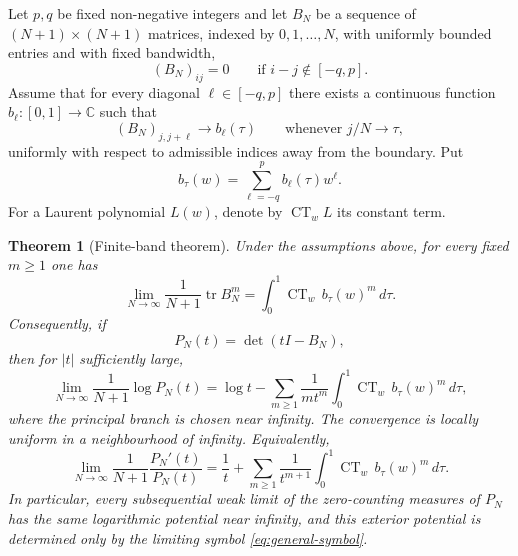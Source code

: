 \documentclass[10pt,twoside,a4paper,reqno]{amsart}
\theoremstyle{plain}
\newtheorem{theo}           {Theorem}
\theoremstyle{definition}
\theoremstyle{remark}
\newenvironment{theorem}{\begin{theo}}{\end{theo}}
\newcommand {\CT} {\operatorname {CT}}
\begin{document}
Let $p,q$ be fixed non-negative integers and let $B_N$ be a sequence of $(N+1)\times (N+1)$ matrices, indexed by $0,1,\ldots,N$, with uniformly bounded entries and with fixed bandwidth,
\[
        (B_N)_{ij}=0\qquad \text{if } i-j\notin[-q,p].
\]
Assume that for every diagonal $\ell\in[-q,p]$ there exists a continuous function $b_\ell:[0,1]\to\mathbb C$ such that
\[
        (B_N)_{j,j+\ell}\longrightarrow b_\ell(\tau)
        \qquad \text{whenever } j/N\to\tau,
\]
uniformly with respect to admissible indices away from the boundary.  Put
\begin{equation}\label{eq:general-symbol}
        b_\tau(w)=\sum_{\ell=-q}^{p} b_\ell(\tau)w^\ell .
\end{equation}
For a Laurent polynomial $L(w)$, denote by $\CT_w L$ its constant term.




\begin{theorem}[Finite-band theorem]
\label{th:mainrec}
Under the assumptions above, for every fixed $m\ge 1$ one has
\begin{equation}\label{eq:general-moments}
        \lim_{N\to\infty}\frac{1}{N+1}\operatorname{tr} B_N^m
        =\int_0^1 \CT_w\, b_\tau(w)^m\,d\tau .
\end{equation}
Consequently, if
\[
        P_N(t)=\det(tI-B_N),
\]
then for $|t|$ sufficiently large,
\begin{equation}\label{eq:general-logdet}
\lim_{N\to\infty}\frac{1}{N+1}\log P_N(t)
=
\log t-
\sum_{m\ge 1}\frac{1}{m t^m}
\int_0^1 \CT_w\, b_\tau(w)^m\,d\tau,
\end{equation}
where the principal branch is chosen near infinity.  The convergence is locally uniform in a neighbourhood of infinity.  Equivalently,
\begin{equation}\label{eq:general-cauchy}
\lim_{N\to\infty}\frac{1}{N+1}\frac{P_N'(t)}{P_N(t)}
=
\frac1t+
\sum_{m\ge 1}\frac{1}{t^{m+1}}
\int_0^1 \CT_w\, b_\tau(w)^m\,d\tau .
\end{equation}
In particular, every subsequential weak limit of the zero-counting measures of $P_N$ has the same logarithmic potential near infinity, and this exterior potential is determined only by the limiting symbol \eqref{eq:general-symbol}.
\end{theorem}
\end{document}

